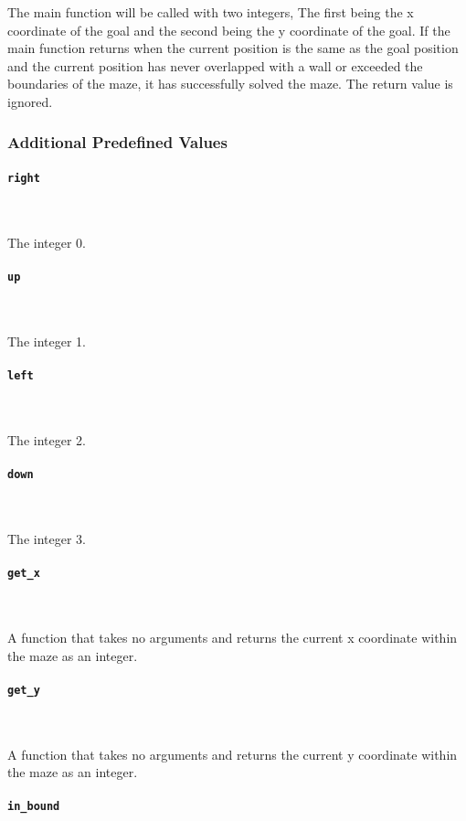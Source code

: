 The main function will be called with two integers, The first being the x coordinate of the goal and the second being the y coordinate of the goal. If the main function returns when the current position is the same as the goal position and the current position has never overlapped with a wall or exceeded the boundaries of the maze, it has successfully solved the maze. The return value is ignored.

\subsubsection{Additional Predefined Values}

\paragraph{\texttt{right}} \

The integer 0.

\paragraph{\texttt{up}} \

The integer 1.

\paragraph{\texttt{left}} \

The integer 2.

\paragraph{\texttt{down}} \

The integer 3.

\paragraph{\texttt{get\_x}} \

A function that takes no arguments and returns the current x coordinate within the maze as an integer.

\paragraph{\texttt{get\_y}} \

A function that takes no arguments and returns the current y coordinate within the maze as an integer.

\paragraph{\texttt{in\_bound}} \

